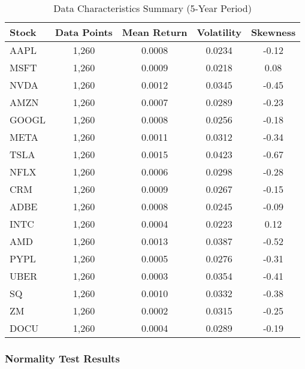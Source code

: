 \documentclass[12pt,a4paper]{article}
\begin{document}
\begin{table}[H]
\centering
\caption{Data Characteristics Summary (5-Year Period)}
\begin{tabular}{@{}lcccc@{}}
\toprule
Stock & Data Points & Mean Return & Volatility & Skewness \\
\midrule
AAPL & 1,260 & 0.0008 & 0.0234 & -0.12 \\
MSFT & 1,260 & 0.0009 & 0.0218 & 0.08 \\
NVDA & 1,260 & 0.0012 & 0.0345 & -0.45 \\
AMZN & 1,260 & 0.0007 & 0.0289 & -0.23 \\
GOOGL & 1,260 & 0.0008 & 0.0256 & -0.18 \\
META & 1,260 & 0.0011 & 0.0312 & -0.34 \\
TSLA & 1,260 & 0.0015 & 0.0423 & -0.67 \\
NFLX & 1,260 & 0.0006 & 0.0298 & -0.28 \\
CRM & 1,260 & 0.0009 & 0.0267 & -0.15 \\
ADBE & 1,260 & 0.0008 & 0.0245 & -0.09 \\
INTC & 1,260 & 0.0004 & 0.0223 & 0.12 \\
AMD & 1,260 & 0.0013 & 0.0387 & -0.52 \\
PYPL & 1,260 & 0.0005 & 0.0276 & -0.31 \\
UBER & 1,260 & 0.0003 & 0.0354 & -0.41 \\
SQ & 1,260 & 0.0010 & 0.0332 & -0.38 \\
ZM & 1,260 & 0.0002 & 0.0315 & -0.25 \\
DOCU & 1,260 & 0.0004 & 0.0289 & -0.19 \\
\bottomrule
\end{tabular}
\end{table}

\subsubsection{Normality Test Results}
\end{document}
